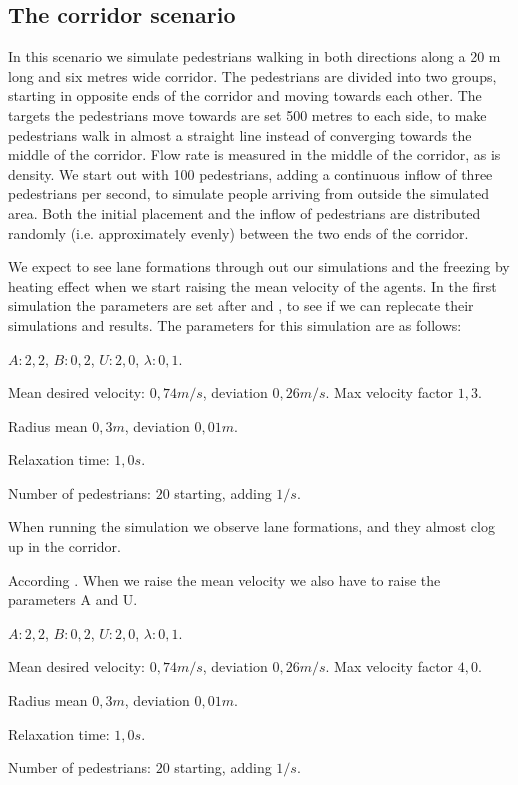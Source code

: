 \subsection{The corridor scenario}
In this scenario we simulate pedestrians walking in both directions along a 20 
m long and six metres wide corridor. The pedestrians are divided into two 
groups, starting in opposite ends of the corridor and moving towards each 
other. The targets the pedestrians move towards are set 500 metres to each 
side, to make pedestrians walk in almost a straight line instead of converging 
towards the middle of the corridor. Flow rate is measured in the middle of the 
corridor, as is density. We start out with 100 pedestrians, adding a 
continuous inflow of three pedestrians per second, to simulate people arriving 
from outside the simulated area. Both the initial placement and the inflow of 
pedestrians are distributed randomly (i.e. approximately evenly) between the 
two ends of the corridor.

We expect to see lane formations through out our simulations
and the freezing by heating effect when we start raising the mean velocity
of the agents.
In the first simulation the parameters are set after \cite{ABconstant} and
\cite{self-org}, to see if we can replecate their simulations and results.
The parameters for this simulation are as follows:

\begin{itemize*}
    \item $A: 2,2$, $B: 0,2$, $U: 2,0$, $\lambda: 0,1$.
    \item Mean desired velocity: $0,74 m/s$, deviation $0,26 m/s$. Max 
        velocity factor $1,3$.
    \item Radius mean $0,3 m$, deviation $0,01 m$.
    \item Relaxation time: $1,0 s$.
    \item Number of pedestrians: $20$ starting, adding $1/s$.
\end{itemize*}

When running the simulation we observe lane formations, and they almost clog up
in the corridor.

According . 
When we raise the mean velocity we also have to raise the parameters A and U.

\begin{itemize*}
    \item $A: 2,2$, $B: 0,2$, $U: 2,0$, $\lambda: 0,1$.
    \item Mean desired velocity: $0,74 m/s$, deviation $0,26 m/s$. Max 
        velocity factor $4,0$.
    \item Radius mean $0,3 m$, deviation $0,01 m$.
    \item Relaxation time: $1,0 s$.
    \item Number of pedestrians: $20$ starting, adding $1/s$.
\end{itemize*}

